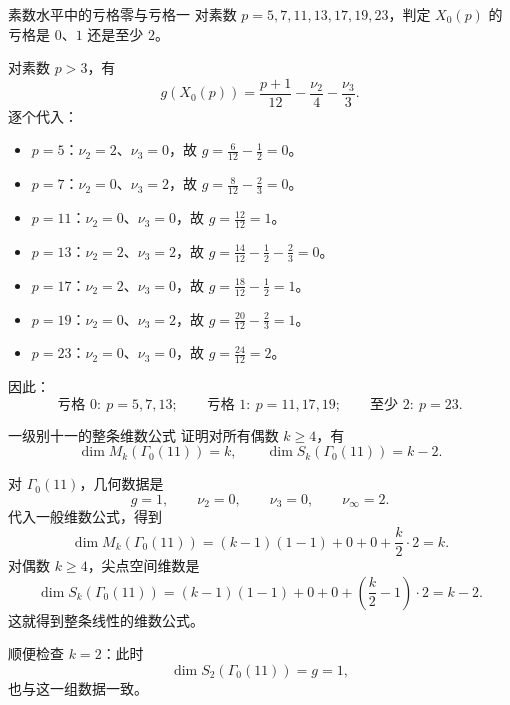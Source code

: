 \begin{problem}{素数水平中的亏格零与亏格一}
\hard
对素数 $p=5,7,11,13,17,19,23$，判定 $X_0(p)$ 的亏格是 $0$、$1$ 还是至少 $2$。
\end{problem}
\begin{solution}
对素数 $p>3$，有
\[
g(X_0(p))=\frac{p+1}{12}-\frac{\nu_2}{4}-\frac{\nu_3}{3}.
\]
逐个代入：
\begin{itemize}
  \item $p=5$：$\nu_2=2$、$\nu_3=0$，故 $g=\frac{6}{12}-\frac{1}{2}=0$。
  \item $p=7$：$\nu_2=0$、$\nu_3=2$，故 $g=\frac{8}{12}-\frac{2}{3}=0$。
  \item $p=11$：$\nu_2=0$、$\nu_3=0$，故 $g=\frac{12}{12}=1$。
  \item $p=13$：$\nu_2=2$、$\nu_3=2$，故 $g=\frac{14}{12}-\frac{1}{2}-\frac{2}{3}=0$。
  \item $p=17$：$\nu_2=2$、$\nu_3=0$，故 $g=\frac{18}{12}-\frac{1}{2}=1$。
  \item $p=19$：$\nu_2=0$、$\nu_3=2$，故 $g=\frac{20}{12}-\frac{2}{3}=1$。
  \item $p=23$：$\nu_2=0$、$\nu_3=0$，故 $g=\frac{24}{12}=2$。
\end{itemize}
因此：
\[
\text{亏格 }0:\ p=5,7,13;
\qquad
\text{亏格 }1:\ p=11,17,19;
\qquad
\text{至少 }2:\ p=23.
\]
\end{solution}

\begin{problem}{一级别十一的整条维数公式}
\hard
证明对所有偶数 $k\ge 4$，有
\[
\dim M_k(\Gamma_0(11))=k,
\qquad
\dim S_k(\Gamma_0(11))=k-2.
\]
\end{problem}
\begin{solution}
对 $\Gamma_0(11)$，几何数据是
\[
g=1,
\qquad \nu_2=0,
\qquad \nu_3=0,
\qquad \nu_\infty=2.
\]
代入一般维数公式，得到
\[
\dim M_k(\Gamma_0(11))=(k-1)(1-1)+0+0+\frac{k}{2}\cdot 2=k.
\]
对偶数 $k\ge 4$，尖点空间维数是
\[
\dim S_k(\Gamma_0(11))=(k-1)(1-1)+0+0+\left(\frac{k}{2}-1\right)\cdot 2=k-2.
\]
这就得到整条线性的维数公式。

顺便检查 $k=2$：此时
\[
\dim S_2(\Gamma_0(11))=g=1,
\]
也与这一组数据一致。
\end{solution}

